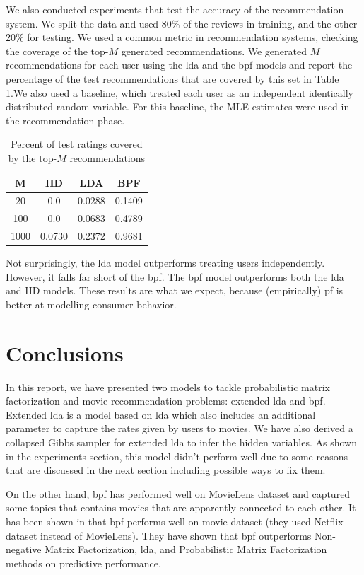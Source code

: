 \documentclass{article} %
\begin{document}
We also conducted experiments that test the accuracy of the recommendation system. We split the data and used $80\%$ of the reviews in training, and the other $20\%$ for testing. We used a common metric in recommendation systems, checking the coverage of the top-$M$ generated recommendations. We generated $M$ recommendations for each user using the \gls{lda} and the \gls{bpf} models and report the percentage of the test recommendations that are covered by this set in Table \ref{table:top-m}.We also used a baseline, which treated each user as an independent identically distributed random variable. For this baseline, the MLE estimates were used in the recommendation phase. 
\begin{table}[h]
    \centering
    \begin{tabular}{c|ccc} \toprule
    \textbf{M}    & \textbf{IID}    & \textbf{LDA}    & \textbf{BPF}    \\ \midrule
    20   & 0.0    & 0.0288 & 0.1409 \\
    100  & 0.0    & 0.0683 & 0.4789 \\
    1000 & 0.0730 & 0.2372 & 0.9681 \\
    \end{tabular}
    \caption {Percent of test ratings covered by the top-$M$ recommendations}
    \label{table:top-m}
\end{table}

Not surprisingly, the \gls{lda} model outperforms treating users independently. However, it falls far short of the \gls{bpf}. The \gls{bpf} model outperforms both the \gls{lda} and IID models. These results are what we expect, because (empirically) \gls{pf} is better at modelling consumer behavior. 

\section{Conclusions}
In this report, we have presented two models to tackle probabilistic matrix 
factorization and movie recommendation problems: extended \gls{lda} and 
\gls{bpf}. Extended \gls{lda} is a model based on \gls{lda} which also includes 
an additional parameter to capture the rates given by users to movies. We have 
also derived a collapsed Gibbs sampler for extended \gls{lda} to infer the hidden 
variables. As shown in the experiments section, this model didn't perform well 
due to some reasons that are discussed in the next section including possible 
ways to fix them. 

On the other hand, \gls{bpf} has performed well on MovieLens dataset and 
captured some topics that contains movies that are apparently connected to each 
other. It has been shown in \cite{gopalan2013scalable} that \gls{bpf} performs 
well on movie dataset (they used Netflix dataset instead of MovieLens). They 
have shown that \gls{bpf} outperforms Non-negative Matrix Factorization, 
\gls{lda}, and Probabilistic Matrix Factorization methods on predictive 
performance. 
\end{document}
